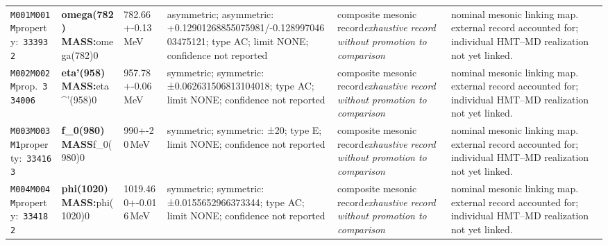 \begin{landscape}
\begin{longtable}{L{1.85cm}L{4.45cm}L{2.35cm}L{4.05cm}L{3.35cm}L{7.15cm}}
\texttt{M001}\newline \texttt{M001M}\newline property:\ \texttt{333932} & \textbf{omega(782) MASS:}\newline omega(782)0 & 782.66+-0.13\,MeV & asymmetric; asymmetric: +0.12901268855075981/-0.12899704603475121; type AC; limit NONE; confidence not reported & composite mesonic record\newline \emph{exhaustive record without promotion to comparison} & nominal mesonic linking map. external record accounted for; individual HMT--MD realization not yet linked. \\
\texttt{M002}\newline \texttt{M002M}\newline prop.\ \texttt{334006} & \textbf{eta'(958) MASS:}\newline eta\textasciicircum{}'(958)0 & 957.78+-0.06\,MeV & symmetric; symmetric: ±0.062631506813104018; type AC; limit NONE; confidence not reported & composite mesonic record\newline \emph{exhaustive record without promotion to comparison} & nominal mesonic linking map. external record accounted for; individual HMT--MD realization not yet linked. \\
\texttt{M003}\newline \texttt{M003M1}\newline property:\ \texttt{334163} & \textbf{f\_\allowbreak{}0(980) MASS}\newline f\_\allowbreak{}0(980)0 & 990+-20\,MeV & symmetric; symmetric: ±20; type E; limit NONE; confidence not reported & composite mesonic record\newline \emph{exhaustive record without promotion to comparison} & nominal mesonic linking map. external record accounted for; individual HMT--MD realization not yet linked. \\
\texttt{M004}\newline \texttt{M004M}\newline property:\ \texttt{334182} & \textbf{phi(1020) MASS:}\newline phi(1020)0 & 1019.460+-0.016\,MeV & symmetric; symmetric: ±0.0155652966373344; type AC; limit NONE; confidence not reported & composite mesonic record\newline \emph{exhaustive record without promotion to comparison} & nominal mesonic linking map. external record accounted for; individual HMT--MD realization not yet linked. \\

\end{longtable}
\end{landscape}
